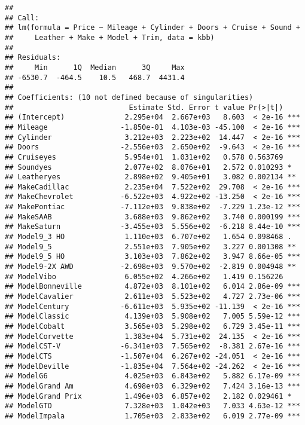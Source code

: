 \documentclass[
]{article}
\begin{document}
\begin{verbatim}
## 
## Call:
## lm(formula = Price ~ Mileage + Cylinder + Doors + Cruise + Sound + 
##     Leather + Make + Model + Trim, data = kbb)
## 
## Residuals:
##     Min      1Q  Median      3Q     Max 
## -6530.7  -464.5    10.5   468.7  4431.4 
## 
## Coefficients: (10 not defined because of singularities)
##                           Estimate Std. Error t value Pr(>|t|)    
## (Intercept)              2.295e+04  2.667e+03   8.603  < 2e-16 ***
## Mileage                 -1.850e-01  4.103e-03 -45.100  < 2e-16 ***
## Cylinder                 3.212e+03  2.223e+02  14.447  < 2e-16 ***
## Doors                   -2.556e+03  2.650e+02  -9.643  < 2e-16 ***
## Cruiseyes                5.954e+01  1.031e+02   0.578 0.563769    
## Soundyes                 2.077e+02  8.076e+01   2.572 0.010293 *  
## Leatheryes               2.898e+02  9.405e+01   3.082 0.002134 ** 
## MakeCadillac             2.235e+04  7.522e+02  29.708  < 2e-16 ***
## MakeChevrolet           -6.522e+03  4.922e+02 -13.250  < 2e-16 ***
## MakePontiac             -7.112e+03  9.838e+02  -7.229 1.23e-12 ***
## MakeSAAB                 3.688e+03  9.862e+02   3.740 0.000199 ***
## MakeSaturn              -3.455e+03  5.556e+02  -6.218 8.44e-10 ***
## Model9_3 HO              1.110e+03  6.707e+02   1.654 0.098468 .  
## Model9_5                 2.551e+03  7.905e+02   3.227 0.001308 ** 
## Model9_5 HO              3.103e+03  7.862e+02   3.947 8.66e-05 ***
## Model9-2X AWD           -2.698e+03  9.570e+02  -2.819 0.004948 ** 
## ModelVibo                6.055e+02  4.266e+02   1.419 0.156226    
## ModelBonneville          4.872e+03  8.101e+02   6.014 2.86e-09 ***
## ModelCavalier            2.611e+03  5.523e+02   4.727 2.73e-06 ***
## ModelCentury            -6.611e+03  5.935e+02 -11.139  < 2e-16 ***
## ModelClassic             4.139e+03  5.908e+02   7.005 5.59e-12 ***
## ModelCobalt              3.565e+03  5.298e+02   6.729 3.45e-11 ***
## ModelCorvette            1.383e+04  5.731e+02  24.135  < 2e-16 ***
## ModelCST-V              -6.341e+03  7.565e+02  -8.381 2.67e-16 ***
## ModelCTS                -1.507e+04  6.267e+02 -24.051  < 2e-16 ***
## ModelDeville            -1.835e+04  7.564e+02 -24.262  < 2e-16 ***
## ModelG6                  4.025e+03  6.843e+02   5.882 6.17e-09 ***
## ModelGrand Am            4.698e+03  6.329e+02   7.424 3.16e-13 ***
## ModelGrand Prix          1.496e+03  6.857e+02   2.182 0.029461 *  
## ModelGTO                 7.328e+03  1.042e+03   7.033 4.63e-12 ***
## ModelImpala              1.705e+03  2.833e+02   6.019 2.77e-09 ***

\end{verbatim}
\end{document}
